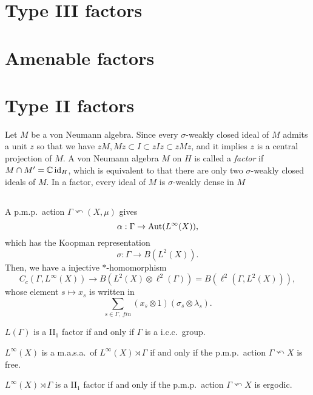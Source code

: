 \documentclass{../../large}
\begin{document}
\chapter{Type III factors}


\chapter{Amenable factors}


\chapter{Type II factors}

\begin{prb}
Let $M$ be a von Neumann algebra.
Since every $\sigma$-weakly closed ideal of $M$ admits a unit $z$ so that we have $zM,Mz\subset I\subset zIz\subset zMz$, and it implies $z$ is a central projection of $M$.
A von Neumann algebra $M$ on $H$ is called a \emph{factor} if $M\cap M'=\mathbb{C}\operatorname{id}_H$, which is equivalent to that there are only two $\sigma$-weakly closed ideals of $M$.
In a factor, every ideal of $M$ is $\sigma$-weakly dense in $M$
\end{prb}


\section{}
\begin{prb}
A p.m.p.~action $\Gamma\curvearrowleft(X,\mu)$ gives
\[\alpha:\Gamma\to\operatorname{Aut}(L^\infty(X)),\]
which has the Koopman representation
\[\sigma:\Gamma\to B(L^2(X)).\]
Then, we have a injective $*$-homomorphism
\[C_c(\Gamma,L^\infty(X))\to B(L^2(X)\otimes\ell^2(\Gamma))=B(\ell^2(\Gamma,L^2(X))),\]
whose element $s\mapsto x_s$ is written in
\[\sum_{s\in\Gamma,\ fin}(x_s\otimes1)(\sigma_s\otimes\lambda_s).\]

\begin{parts}
\item $L(\Gamma)$ is a II$_1$ factor if and only if $\Gamma$ is a i.c.c.~group.
\item $L^\infty(X)$ is a m.a.s.a.~of $L^\infty(X)\rtimes\Gamma$ if and only if the p.m.p.~action $\Gamma\curvearrowleft X$ is free.
\item $L^\infty(X)\rtimes\Gamma$ is a II$_1$ factor if and only if the p.m.p.~action $\Gamma\curvearrowleft X$ is ergodic.
\end{parts}
\end{prb}
\end{document}
